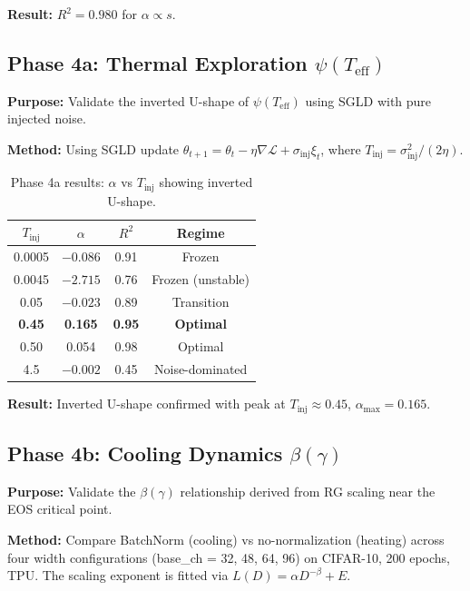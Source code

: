 \documentclass[11pt, a4paper]{article}
\theoremstyle{definition}
\begin{document}
\textbf{Result:} $R^2 = 0.980$ for $\alpha \propto s$.

\subsection{Phase 4a: Thermal Exploration $\psi(T_{\text{eff}})$}
\label{sec:phase4a}

\textbf{Purpose:} Validate the inverted U-shape of $\psi(T_{\text{eff}})$ using SGLD with pure injected noise.

\textbf{Method:} Using SGLD update $\theta_{t+1} = \theta_t - \eta\nabla\mathcal{L} + \sigma_{\text{inj}}\xi_t$, where $T_{\text{inj}} = \sigma_{\text{inj}}^2 / (2\eta)$.

\begin{table}[htbp]
\centering
\caption{Phase 4a results: $\alpha$ vs $T_{\text{inj}}$ showing inverted U-shape.}
\label{tab:phase4a_results}
\begin{tabular}{@{}cccc@{}}
\toprule
$T_{\text{inj}}$ & $\alpha$ & $R^2$ & \textbf{Regime} \\
\midrule
0.0005 & $-0.086$ & 0.91 & Frozen \\
0.0045 & $-2.715$ & 0.76 & Frozen (unstable) \\
0.05 & $-0.023$ & 0.89 & Transition \\
\textbf{0.45} & \textbf{0.165} & \textbf{0.95} & \textbf{Optimal} \\
0.50 & 0.054 & 0.98 & Optimal \\
4.5 & $-0.002$ & 0.45 & Noise-dominated \\
\bottomrule
\end{tabular}
\end{table}

\textbf{Result:} Inverted U-shape confirmed with peak at $T_{\text{inj}} \approx 0.45$, $\alpha_{\text{max}} = 0.165$.

\subsection{Phase 4b: Cooling Dynamics $\beta(\gamma)$}
\label{sec:phase4b}

\textbf{Purpose:} Validate the $\beta(\gamma)$ relationship derived from RG scaling near the EOS critical point.

\textbf{Method:} Compare BatchNorm (cooling) vs no-normalization (heating) across four width configurations (base\_ch = 32, 48, 64, 96) on CIFAR-10, 200 epochs, TPU. The scaling exponent is fitted via $L(D) = \alpha D^{-\beta} + E$.
\end{document}
